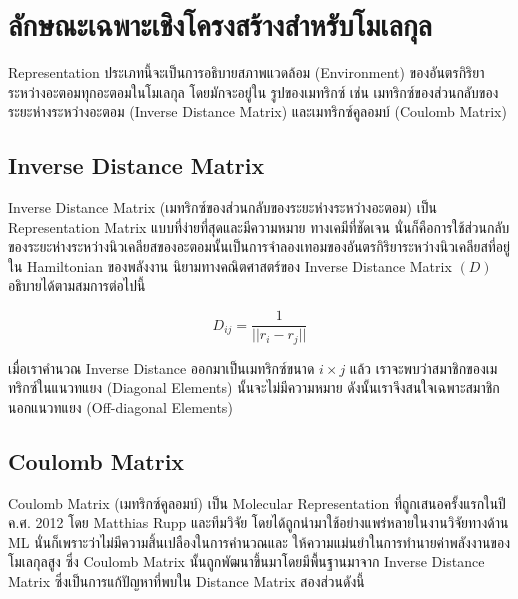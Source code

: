 \section{ลักษณะเฉพาะเชิงโครงสร้างสำหรับโมเลกุล}
\label{sec:struc_feat_mol}

Representation ประเภทนี้จะเป็นการอธิบายสภาพแวดล้อม (Environment) ของอันตรกิริยาระหว่างอะตอมทุกอะตอมในโมเลกุล โดยมักจะอยู่ใน%
รูปของเมทริกซ์ เช่น เมทริกซ์ของส่วนกลับของระยะห่างระหว่างอะตอม (Inverse Distance Matrix) และเมทริกซ์คูลอมบ์ (Coulomb Matrix)

\subsection{Inverse Distance Matrix}
\label{ssec:inv_dist_mat}

Inverse Distance Matrix (เมทริกซ์ของส่วนกลับของระยะห่างระหว่างอะตอม) เป็น Representation Matrix แบบที่ง่ายที่สุดและมีความหมาย%
ทางเคมีที่ชัดเจน นั่นก็คือการใช้ส่วนกลับของระยะห่างระหว่างนิวเคลียสของอะตอมนั้นเป็นการจำลองเทอมของอันตรกิริยาระหว่างนิวเคลียสที่อยู่ใน
Hamiltonian ของพลังงาน นิยามทางคณิตศาสตร์ของ Inverse Distance Matrix $(D)$ อธิบายได้ตามสมการต่อไปนี้

\begin{equation}
    D_{ij} = \frac{1}{||r_{i} - r_{j}||}
\end{equation}

เมื่อเราคำนวณ Inverse Distance ออกมาเป็นเมทริกซ์ขนาด $i \times j$ แล้ว เราจะพบว่าสมาชิกของเมทริกซ์ในแนวทแยง (Diagonal
Elements) นั้นจะไม่มีความหมาย ดังนั้นเราจึงสนใจเฉพาะสมาชิกนอกแนวทแยง (Off-diagonal Elements)

\subsection{Coulomb Matrix}
\label{ssec:coulomb_mat}

Coulomb Matrix (เมทริกซ์คูลอมบ์) เป็น Molecular Representation ที่ถูกเสนอครั้งแรกในปี ค.ศ. 2012 โดย Matthias Rupp
และทีมวิจัย\autocite{rupp2012} โดยได้ถูกนำมาใช้อย่างแพร่หลายในงานวิจัยทางด้าน ML นั่นก็เพราะว่าไม่มีความสิ้นเปลืองในการคำนวณและ%
ให้ความแม่นยำในการทำนายค่าพลังงานของโมเลกุลสูง ซึ่ง Coulomb Matrix นั้นถูกพัฒนาขึ้นมาโดยมีพื้นฐานมาจาก Inverse Distance Matrix
ซึ่งเป็นการแก้ปัญหาที่พบใน Distance Matrix สองส่วนดังนี้

